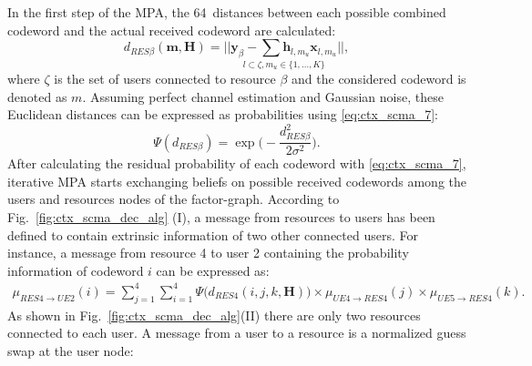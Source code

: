 In the first step of the MPA, the 64~distances between each possible
combined codeword and the actual received codeword are calculated:
\begin{equation}
  \label{eq:ctx_scma_5}
  d_{RES  \beta}(\bm{m}, \bm{H}) =
  \underset{l \subset \zeta, m_u\in\{1,...,K\}}{||\bm{y}_\beta -
  \sum \bm{h}_{l,m_u} \bm{x}_{l,m_u} ||},
\end{equation}
where $\zeta$ is the set of users connected to resource $\beta$ and the
considered codeword is denoted as $m$.
Assuming perfect channel estimation and Gaussian noise, these Euclidean
distances can be expressed as probabilities using
\eqref{eq:ctx_scma_7}:
\begin{equation}
  \label{eq:ctx_scma_7}
  \Psi(d_{RES \beta}) = \exp \Bigg(-\frac{d_{RES \beta}^2}{2\sigma^2} \Bigg).
\end{equation}
After calculating the residual probability of each codeword with
\eqref{eq:ctx_scma_7}, iterative MPA starts exchanging beliefs on possible
received codewords among the users and resources nodes of the factor-graph.
According to Fig.~\ref{fig:ctx_scma_dec_alg} (I), a message from resources to
users has been defined to contain extrinsic information of two other connected
users. For instance, a message from resource 4 to user 2 containing the
probability information of codeword $i$ can be expressed as:
\begin{equation}
  \label{eq:ctx_scma_8}
  \begin{split}
  \mu_{RES4 \rightarrow UE2}(i) = \sum\limits_{j=1}^4 \sum\limits_{i=1}^4 \Psi
  \Big(d_{RES4}(i,j,k,\bm{H}) \Big)
  \times \mu_{UE4 \rightarrow RES4}(j) \times \mu_{UE5 \rightarrow RES4}(k).
  \end{split}
\end{equation}
As shown in Fig.~\ref{fig:ctx_scma_dec_alg}(II) there are only two resources
connected to each user. A message from a user to a resource is a normalized
guess swap at the user node:
